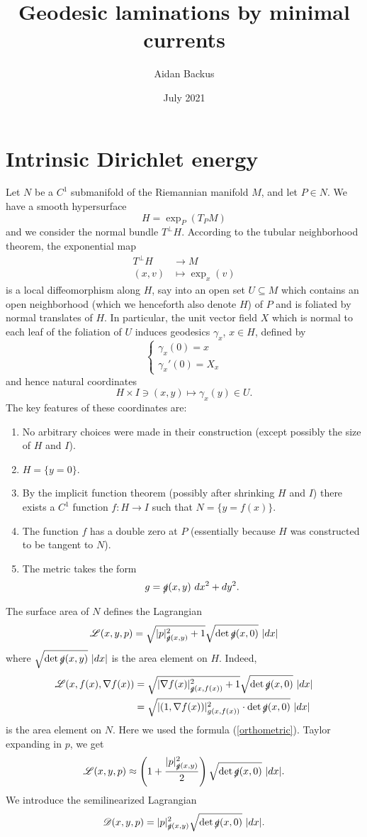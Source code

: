 \documentclass[reqno,12pt,letterpaper]{amsart}
\title[Geodesic laminations by minimal currents]{Geodesic laminations by minimal currents}
\author{Aidan Backus}
\date{July 2021}
\newcommand{\Dir}{\mathscr D}
\newcommand{\Lagrange}{\mathscr L}
\theoremstyle{definition}
\numberwithin{equation}{section}
\begin{document}


\section{Intrinsic Dirichlet energy}
Let $N$ be a $C^1$ submanifold of the Riemannian manifold $M$, and let $P \in N$.
We have a smooth hypersurface
$$H = \exp_P(T_PM)$$
and we consider the normal bundle $T^\perp H$.
According to the tubular neighborhood theorem, the exponential map
\begin{align*}
T^\perp H &\to M \\
(x, v) &\mapsto \exp_x(v)
\end{align*}
is a local diffeomorphism along $H$, say into an open set $U \subseteq M$ which contains an open neighborhood (which we henceforth also denote $H$) of $P$ and is foliated by normal translates of $H$.
In particular, the unit vector field $X$ which is normal to each leaf of the foliation of $U$ induces geodesics $\gamma_x$, $x \in H$, defined by
$$\begin{cases}
\gamma_x(0) = x\\
\gamma_x'(0) = X_x
\end{cases}$$
and hence natural coordinates
$$H \times I \ni (x, y) \mapsto \gamma_x(y) \in U.$$
The key features of these coordinates are:
\begin{enumerate}
\item No arbitrary choices were made in their construction (except possibly the size of $H$ and $I$).
\item $H = \{y = 0\}$.
\item By the implicit function theorem (possibly after shrinking $H$ and $I$) there exists a $C^1$ function $f: H \to I$ such that $N = \{y = f(x)\}$.
\item The function $f$ has a double zero at $P$ (essentially because $H$ was constructed to be tangent to $N$).
\item The metric takes the form
\begin{equation}\label{orthometric}
g = \slashed g(x, y) ~dx^2 + dy^2.
\end{equation}
\end{enumerate}

The surface area of $N$ defines the Lagrangian
$$\Lagrange (x, y, p) = \sqrt{|p|_{\slashed g(x, y)}^2 + 1} \sqrt{\det \slashed g(x, 0)} ~|dx|$$
where $\sqrt{\det \slashed g(x, y)} ~|dx|$ is the area element on $H$.
Indeed,
\begin{align*}
\Lagrange(x, f(x), \nabla f(x))
&= \sqrt{|\nabla f(x)|_{\slashed g(x, f(x))}^2 + 1}  \sqrt{\det \slashed g(x, 0)} ~|dx|\\
&= \sqrt{|(1, \nabla f(x))|_{g(x, f(x))}^2 \cdot \det \slashed g(x, 0)} ~|dx|
\end{align*}
is the area element on $N$. Here we used the formula (\ref{orthometric}).
Taylor expanding in $p$, we get
$$\Lagrange (x, y, p) \approx \left(1 + \frac{|p|_{\slashed g(x, y)}^2}{2} \right) \sqrt{\det \slashed g(x, 0)} ~|dx|.$$
We introduce the semilinearized Lagrangian
$$\Dir (x, y, p) = |p|_{\slashed g(x, y)}^2 \sqrt{\det \slashed g(x, 0)} ~|dx|.$$
\end{document}
